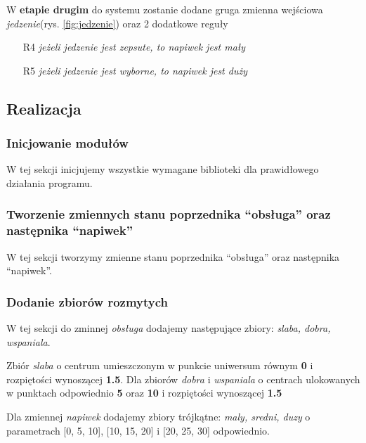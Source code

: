 \documentclass[a4paper, 10pt]{article}
\begin{document}
W \textbf{etapie drugim} do systemu zostanie dodane gruga zmienna wejściowa \emph{jedzenie}(rys. \ref{fig:jedzenie}) oraz 2 dodatkowe reguły
\begin{itemize}
	\item[R4] \emph{jeżeli jedzenie jest zepsute, to napiwek jest mały}
	\item[R5] \emph{jeżeli jedzenie jest wyborne, to napiwek jest duży}
\end{itemize}


\subsection{Realizacja}
\subsubsection{Inicjowanie modułów}

W tej sekcji inicjujemy wszystkie wymagane biblioteki dla prawidłowego działania programu.



\subsubsection{Tworzenie zmiennych stanu poprzednika ``obsługa'' oraz następnika ``napiwek''}

W tej sekcji tworzymy zmienne stanu poprzednika ``obsługa'' oraz następnika ``napiwek''.



\subsubsection{Dodanie zbiorów rozmytych}
 
W tej sekcji do zminnej \emph{obsługa} dodajemy następujące zbiory: \emph{slaba, dobra, wspaniala}. 

Zbiór \emph{slaba} o centrum umieszczonym w punkcie uniwersum równym \textbf{0} i rozpiętości wynoszącej \textbf{1.5}. Dla zbiorów \emph{dobra} i \emph{wspaniala} o centrach ulokowanych w punktach odpowiednio \textbf{5} oraz \textbf{10} i rozpiętości wynoszącej \textbf{1.5}

Dla zmiennej \emph{napiwek} dodajemy zbiory trójkątne: \emph{maly, sredni, duzy} o parametrach [0, 5, 10], [10, 15, 20] i [20, 25, 30] odpowiednio.


\end{document}
